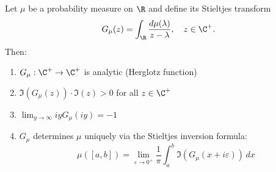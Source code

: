 \begin{lemma}\label{lem:stieltjes}
Let $\mu$ be a probability measure on $\R$ and define its Stieltjes transform
\[
G_\mu(z) = \int_\R \frac{d\mu(\lambda)}{z - \lambda}, \quad z \in \C^+.
\]
Then:
\begin{enumerate}
\item $G_\mu : \C^+ \to \C^+$ is analytic (Herglotz function)
\item $\Im(G_\mu(z)) \cdot \Im(z) > 0$ for all $z \in \C^+$
\item $\lim_{y \to \infty} iy G_\mu(iy) = -1$
\item $G_\mu$ determines $\mu$ uniquely via the Stieltjes inversion formula:
\[
\mu([a, b]) = \lim_{\varepsilon \to 0^+} \frac{1}{\pi} \int_a^b \Im(G_\mu(x + i\varepsilon)) \, dx
\]
\end{enumerate}
\end{lemma}
